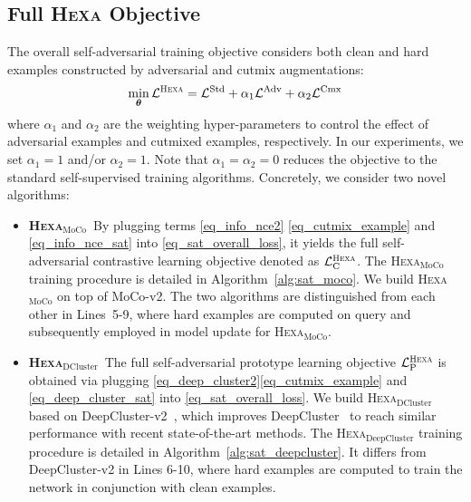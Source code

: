 \documentclass[10pt,twocolumn,letterpaper]{article}
\newcommand{\thetav}{\boldsymbol{\theta}}
\newcommand{\Lcal}{\mathcal{L}}
\newcommand{\shortname}{\textsc{Hexa}}
\begin{document}
\subsection{Full \shortname{} Objective}
The overall self-adversarial training objective considers both clean and hard examples constructed by adversarial and cutmix augmentations:
\begin{align} 
\hspace{-0mm}
\min_{\thetav}  \Lcal^{\text{\shortname{}}} =  \Lcal^{\text{Std}}  +  \alpha_1 \Lcal^{\text{Adv}} +  \alpha_2 \Lcal^{\text{Cmx}} 
\label{eq_sat_overall_loss}
\end{align}
where $\alpha_1$ and $\alpha_2$ are the weighting hyper-parameters to control the effect of adversarial examples and cutmixed examples, respectively. In our experiments, we set $\alpha_1\!\!  =\!1$ and/or $\!\alpha_2\!\! =\!1$. Note that $\alpha_1\!\! =\! \alpha_2\! \!=\!0$ reduces the objective to the standard self-supervised training algorithms. Concretely, we consider two novel algorithms: 

\begin{itemize}\item {\bf \shortname{}$_{\text{MoCo}}$}~By plugging terms \eqref{eq_info_nce2} \eqref{eq_cutmix_example} and \eqref{eq_info_nce_sat} into \eqref{eq_sat_overall_loss}, it yields the full self-adversarial   contrastive learning objective denoted as $\Lcal^{\rm \shortname{}}_{\rm C}$. The \shortname{}$_{\text{MoCo}}$ training procedure is detailed in Algorithm~\ref{alg:sat_moco}. We build \shortname{}$_{\text{MoCo}}$ on top of MoCo-v2. The two algorithms are distinguished from each other in Lines~5-9, where hard examples are computed on query and subsequently employed in model update for \shortname{}$_{\text{MoCo}}$.
    \vspace{-0mm}
    \item  {\bf \shortname{}$_{\text{DCluster}}$}~The  full  self-adversarial prototype learning objective $\Lcal^{\rm \shortname{}}_{\rm P}$ is obtained via plugging \eqref{eq_deep_cluster2}\eqref{eq_cutmix_example} and \eqref{eq_deep_cluster_sat} into \eqref{eq_sat_overall_loss}.  We build \shortname{}$_{\text{DCluster}}$ based on DeepCluster-v2~\cite{li2020prototypical}, which improves DeepCluster~\cite{caron2018deepcluster} to reach similar performance with recent state-of-the-art methods. The \shortname{}$_{\text{DeepCluster}}$ training procedure is detailed in Algorithm~\ref{alg:sat_deepcluster}. It differs from DeepCluster-v2 in Lines 6-10, where hard examples are computed to train the network in conjunction with clean examples.
    \vspace{-0mm}
\end{itemize}
\textbf{}
\end{document}
